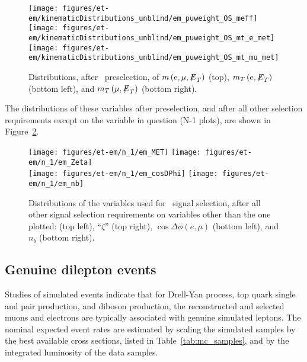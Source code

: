 \begin{figure}[thbp!]\centering
  \texttt{[image: figures/et-em/kinematicDistributions\_unblind/em\_puweight\_OS\_meff]} \\
  \texttt{[image: figures/et-em/kinematicDistributions\_unblind/em\_puweight\_OS\_mt\_e\_met]}
  \texttt{[image: figures/et-em/kinematicDistributions\_unblind/em\_puweight\_OS\_mt\_mu\_met]}
  \caption{\label{fig:em_preselection_distributions3} Distributions,
    after \tetm ~preselection, of $m\left(e, \mu, {\not\mathrel{E}}_T\right)$
    (top), $m_{T}\left(e, {\not\mathrel{E}}_T\right)$ (bottom left), and
    $m_{T}\left(\mu, {\not\mathrel{E}}_T\right)$ (bottom right).}
\end{figure}

The distributions of these variables after preselection, and after
all other selection requirements except on the variable in question (N-1 plots), are shown in
Figure~\ref{fig:em_nm1_distributions}.

\begin{figure}[thbp!]\centering
  \texttt{[image: figures/et-em/n\_1/em\_MET]}
  \texttt{[image: figures/et-em/n\_1/em\_Zeta]} \\
  \texttt{[image: figures/et-em/n\_1/em\_cosDPhi]}
  \texttt{[image: figures/et-em/n\_1/em\_nb]}
  \caption{\label{fig:em_nm1_distributions} Distributions of the
    variables used for \tetm ~signal selection, after all other signal
    selection requirements on variables other than the one plotted:
    \ETslash (top left), ``$\zeta$'' (top right), $\cos{\Delta \phi
      (e,\mu)}$ (bottom left), and $n_b$ (bottom right).}
\end{figure}

\subsection{Genuine dilepton events}
Studies of simulated events indicate that for Drell-Yan process, top
quark single and pair production, and diboson production, the
reconstructed and selected muons and electrons are typically
associated with genuine simulated leptons.  The nominal expected event
rates are estimated by scaling the simulated samples by the best
available cross sections, listed in Table~\ref{tab:mc_samples}, and by
the integrated luminosity of the data samples.

